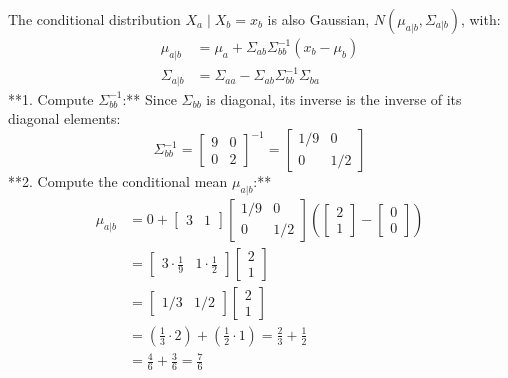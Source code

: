 \documentclass{article}
\begin{document}
The conditional distribution $X_a \mid X_b = x_b$ is also Gaussian, $N(\mu_{a|b}, \Sigma_{a|b})$, with:
\begin{align*}
    \mu_{a|b} &= \mu_a + \Sigma_{ab} \Sigma_{bb}^{-1} (x_b - \mu_b) \\
    \Sigma_{a|b} &= \Sigma_{aa} - \Sigma_{ab} \Sigma_{bb}^{-1} \Sigma_{ba}
\end{align*}
**1. Compute $\Sigma_{bb}^{-1}$:**
Since $\Sigma_{bb}$ is diagonal, its inverse is the inverse of its diagonal elements:
$$ \Sigma_{bb}^{-1} = \begin{bmatrix} 9 & 0 \\ 0 & 2 \end{bmatrix}^{-1} = \begin{bmatrix} 1/9 & 0 \\ 0 & 1/2 \end{bmatrix} $$
**2. Compute the conditional mean $\mu_{a|b}$:**
\begin{align*}
    \mu_{a|b} &= 0 + \begin{bmatrix} 3 & 1 \end{bmatrix} \begin{bmatrix} 1/9 & 0 \\ 0 & 1/2 \end{bmatrix} \left( \begin{bmatrix} 2 \\ 1 \end{bmatrix} - \begin{bmatrix} 0 \\ 0 \end{bmatrix} \right) \\
              &= \begin{bmatrix} 3 \cdot \frac{1}{9} & 1 \cdot \frac{1}{2} \end{bmatrix} \begin{bmatrix} 2 \\ 1 \end{bmatrix} \\
              &= \begin{bmatrix} 1/3 & 1/2 \end{bmatrix} \begin{bmatrix} 2 \\ 1 \end{bmatrix} \\
              &= \left(\frac{1}{3} \cdot 2\right) + \left(\frac{1}{2} \cdot 1\right) = \frac{2}{3} + \frac{1}{2} \\
              &= \frac{4}{6} + \frac{3}{6} = \frac{7}{6}
\end{align*}
\end{document}
